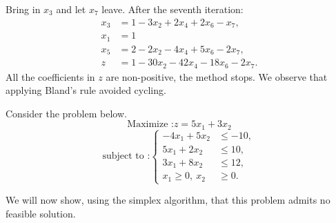 \begin{example}
    Bring in \(x_3\) and let \(x_7\) leave. After the seventh iteration:
    \[
        \begin{aligned}
        x_3 &= 1 - 3x_2 + 2x_4 + 2x_6 - x_7,\\
        x_1 &= 1 \\
        x_5 &= 2 - 2x_2 - 4x_4 + 5x_6 - 2x_7,\\
        \hline
        z &= 1 - 30x_2 - 42x_4 - 18x_6 - 2x_7.
        \end{aligned}
    \]
    All the coefficients in \(z\) are non-positive, the method stops. We observe that applying Bland’s rule avoided cycling.
\end{example}

\begin{example}
    \item Consider the problem below.
    \[
        \text{Maximize :} z = 5x_1 + 3x_2
    \]
    \[
        \text{subject to :}
        \left\{
        \begin{aligned}
        -4x_1 + 5x_2 &\leqslant -10,\\
        5x_1 + 2x_2 &\leqslant 10,\\
        3x_1 + 8x_2 &\leqslant 12,\\
        x_1 \ge 0,\ x_2 &\ge 0.
        \end{aligned}
        \right.
    \]

    We will now show, using the simplex algorithm, that this problem admits no feasible solution.


\end{example}
